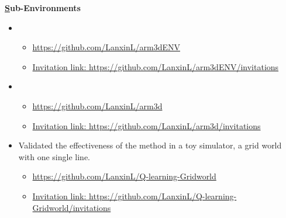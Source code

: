 \documentclass[letterpaper,11pt]{article}
\newcommand{\resumeItem}[2]{
  \item\small{
    \textbf{#1}{#2 \vspace{-2pt}}
  }
}
\begin{document}
        \resumeItem{\href{}Sub-Environments} \\
        \begin{itemize}
          \item{}
          \begin{itemize} \item \href{https://github.com/LanxinL/arm3dENV}{https://github.com/LanxinL/arm3dENV} \end{itemize}          
          \begin{itemize} \item \href{https://github.com/LanxinL/arm3dENV/invitations}{Invitation link: https://github.com/LanxinL/arm3dENV/invitations} \end{itemize}
            \item{}
          \begin{itemize} \item \href{https://github.com/LanxinL/arm3d}{https://github.com/LanxinL/arm3d} \end{itemize}
          \begin{itemize} \item \href{https://github.com/LanxinL/arm3d/invitations}{Invitation link: https://github.com/LanxinL/arm3d/invitations} \end{itemize}
          \item {Validated the effectiveness of the method in a toy simulator, a grid world with one single line.}
          \begin{itemize} \item \href{https://github.com/LanxinL/Q-learning-Gridworld}{https://github.com/LanxinL/Q-learning-Gridworld} \end{itemize}
          \begin{itemize} \item \href{https://github.com/LanxinL/Q-learning-Gridworld/invitations}{Invitation link: https://github.com/LanxinL/Q-learning-Gridworld/invitations} \end{itemize}
          \end{itemize}
\end{document}
